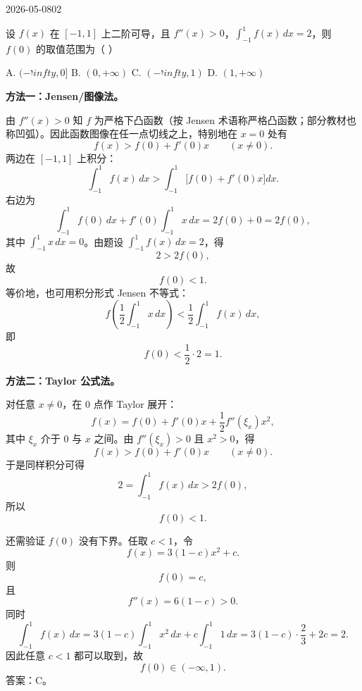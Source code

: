 \begin{mistake}{2026-05-08}{02}

\begin{problemcontent}
设 \(f(x)\) 在 \([-1,1]\) 上二阶可导，且 \(f''(x)>0\)，\(\displaystyle \int_{-1}^{1} f(x)\,dx=2\)，则 \(f(0)\) 的取值范围为（ ）

A. \((-יִinfty,0]\) \quad B. \((0,+\infty)\) \quad C. \((-יִinfty,1)\) \quad D. \((1,+\infty)\)
\end{problemcontent}

\begin{solutioncontent}
\textbf{方法一：Jensen/图像法。}

由 \(f''(x)>0\) 知 \(f\) 为严格下凸函数（按 Jensen 术语称严格凸函数；部分教材也称凹弧）。因此函数图像在任一点切线之上，特别地在 \(x=0\) 处有
\[
f(x)>f(0)+f'(0)x \qquad (x\neq 0).
\]
两边在 \([-1,1]\) 上积分：
\[
\int_{-1}^{1}f(x)\,dx>
\int_{-1}^{1}\bigl[f(0)+f'(0)x\bigr]dx.
\]
右边为
\[
\int_{-1}^{1}f(0)\,dx+f'(0)\int_{-1}^{1}x\,dx
=2f(0)+0=2f(0),
\]
其中 \(\displaystyle \int_{-1}^{1}x\,dx=0\)。由题设 \(\displaystyle \int_{-1}^{1}f(x)\,dx=2\)，得
\[
2>2f(0),
\]
故
\[
f(0)<1.
\]
等价地，也可用积分形式 Jensen 不等式：
\[
f\left(\frac{1}{2}\int_{-1}^{1}x\,dx\right)
<\frac{1}{2}\int_{-1}^{1}f(x)\,dx,
\]
即
\[
f(0)<\frac{1}{2}\cdot 2=1.
\]

\textbf{方法二：Taylor 公式法。}

对任意 \(x\neq 0\)，在 \(0\) 点作 Taylor 展开：
\[
f(x)=f(0)+f'(0)x+\frac12 f''(\xi_x)x^2,
\]
其中 \(\xi_x\) 介于 \(0\) 与 \(x\) 之间。由 \(f''(\xi_x)>0\) 且 \(x^2>0\)，得
\[
f(x)>f(0)+f'(0)x \qquad (x\neq 0).
\]
于是同样积分可得
\[
2=\int_{-1}^{1}f(x)\,dx>2f(0),
\]
所以
\[
f(0)<1.
\]

还需验证 \(f(0)\) 没有下界。任取 \(c<1\)，令
\[
f(x)=3(1-c)x^2+c.
\]
则
\[
f(0)=c,
\]
且
\[
f''(x)=6(1-c)>0.
\]
同时
\[
\int_{-1}^{1}f(x)\,dx
=3(1-c)\int_{-1}^{1}x^2\,dx+c\int_{-1}^{1}1\,dx
=3(1-c)\cdot \frac23+2c
=2.
\]
因此任意 \(c<1\) 都可以取到，故
\[
f(0)\in(-\infty,1).
\]
答案：C。
\end{solutioncontent}


\end{mistake}
